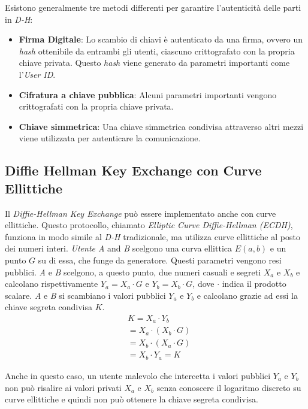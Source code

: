 \noindent Esistono generalmente tre metodi differenti per garantire l'autenticità delle parti in \emph{D-H}:
\begin{itemize}
	\item \textbf{Firma Digitale}: Lo scambio di chiavi è autenticato da una firma, ovvero un \emph{hash} ottenibile da entrambi gli utenti, ciascuno crittografato con la propria chiave privata. Questo \emph{hash} viene generato da parametri importanti come l'\emph{User ID}.
	\item \textbf{Cifratura a chiave pubblica}: Alcuni parametri importanti vengono crittografati con la propria chiave privata.
	\item \textbf{Chiave simmetrica}: Una chiave simmetrica condivisa attraverso altri mezzi viene utilizzata per autenticare la comunicazione.
\end{itemize}

\subsection{Diffie Hellman Key Exchange con Curve Ellittiche}
\label{sec:ecdh}

Il \emph{Diffie-Hellman Key Exchange} può essere implementato anche con curve ellittiche. Questo protocollo, chiamato \emph{Elliptic Curve Diffie-Hellman (ECDH)}, funziona in modo simile al \emph{D-H} tradizionale, ma utilizza curve ellittiche al posto dei numeri interi.
\emph{Utente A} and \emph{B} scelgono una curva ellittica $E(a,b)$ e un punto $G$ su di essa, che funge da generatore. Questi parametri vengono resi pubblici.
\emph{A} e \emph{B} scelgono, a questo punto, due numeri casuali e segreti $X_a$ e $X_b$ e calcolano rispettivamente $Y_a = X_a \cdot G$ e $Y_b = X_b \cdot G$, dove $\cdot$ indica il prodotto scalare.
\emph{A} e \emph{B} si scambiano i valori pubblici $Y_a$ e $Y_b$ e calcolano grazie ad essi la chiave segreta condivisa $K$.
\begin{equation}
	\begin{aligned}
		&K = X_a \cdot Y_b\\
		&= X_a \cdot (X_b \cdot G)\\
		&= X_b \cdot (X_a \cdot G)\\
		&= X_b \cdot Y_a = K
	\end{aligned}
\end{equation}

Anche in questo caso, un utente malevolo che intercetta i valori pubblici $Y_a$ e $Y_b$ non può risalire ai valori privati $X_a$ e $X_b$ senza conoscere il logaritmo discreto su curve ellittiche e quindi non può ottenere la chiave segreta condivisa.

